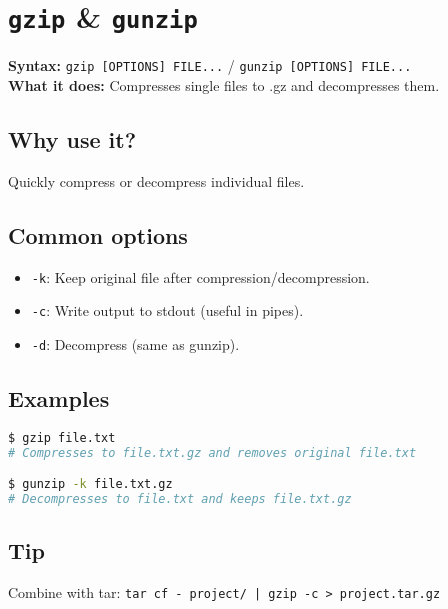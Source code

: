 \documentclass[10pt,oneside]{scrbook}
\begin{document}
\section{\texttt{gzip} \& \texttt{gunzip}}
\begin{cmdbox}
  \textbf{Syntax:} \lstinline!gzip [OPTIONS] FILE...! / \lstinline!gunzip [OPTIONS] FILE...! \\
  \textbf{What it does:} Compresses single files to .gz and decompresses them.
\end{cmdbox}
\begin{commanddetails}
  \subsection*{Why use it?}
    Quickly compress or decompress individual files.

  \subsection*{Common options}
    \begin{itemize}
      \item \lstinline!-k!: Keep original file after compression/decompression.  
      \item \lstinline!-c!: Write output to stdout (useful in pipes).  
      \item \lstinline!-d!: Decompress (same as gunzip).
    \end{itemize}

  \subsection*{Examples}
  \begin{lstlisting}[language=bash]
$ gzip file.txt
# Compresses to file.txt.gz and removes original file.txt

$ gunzip -k file.txt.gz
# Decompresses to file.txt and keeps file.txt.gz
  \end{lstlisting}

  \subsection*{Tip}
    Combine with tar:  
    \lstinline!tar cf - project/ | gzip -c > project.tar.gz!
\end{commanddetails}
\end{document}
